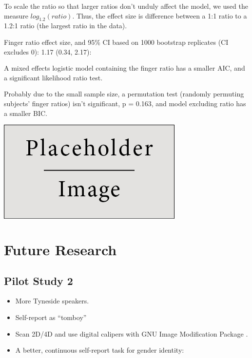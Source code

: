 \documentclass[a0,portrait]{a0poster}
\begin{document}
\begin{multicols}{2}
To scale the ratio so that larger ratios don't unduly affect the model, we used the measure $log_1.2(ratio)$. Thus, the effect size is difference between a 1:1 ratio to a 1.2:1 ratio (the largest ratio in the data).

Finger ratio effect size, and 95\% CI based on 1000 bootstrap replicates (CI excludes 0): 1.17 (0.34, 2.17):

A mixed effects logistic model containing the finger ratio has a smaller AIC, and a significant likelihood ratio test.

Probably due to the small sample size, a permutation test (randomly permuting subjects' finger ratios) isn't significant, p = 0.163, and model excluding ratio has a smaller BIC.


\begin{center}\vspace{1cm}
\includegraphics[width=0.8\linewidth]{placeholder}
\end{center}\vspace{1cm}


\section*{Future Research}

\begin{multicols}{2}
\subsection*{Pilot Study 2}
\begin{itemize}
\item More Tyneside speakers.
\item Self-report as ``tomboy''
\item Scan 2D/4D and use digital calipers with GNU Image Modification Package \citep[][]{allawayetal2009}.
\item A better, continuous self-report task for gender identity:
\end{itemize}


\end{multicols}
\end{multicols}
\end{document}
